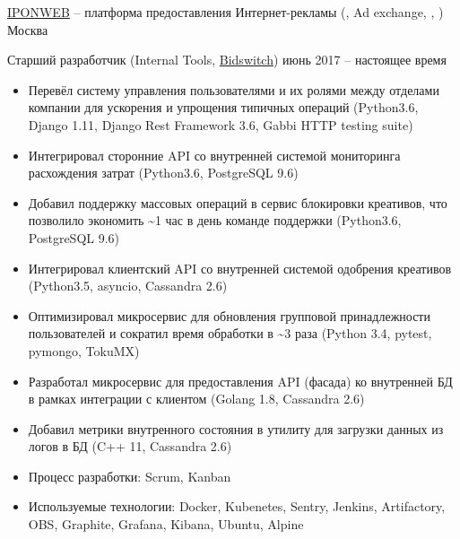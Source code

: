 \documentclass[unicode, 10pt, a4paper, oneside, fleqn]{article}
\begin{document}
\job  %
    {\href{http://www.iponweb.com}{IPONWEB} -- платформа предоставления
     Интернет-рекламы (, Ad exchange, , )}
    {Москва}
    {
        \position  %
            {Старший разработчик (Internal Tools, \href{http://www.bidswitch.com/}{Bidswitch})}
            {июнь 2017 -- настоящее время}
            {
                \begin{itemize}
                    \item{Перевёл систему управления пользователями и их ролями
                          между отделами компании для ускорения и упрощения
                          типичных операций (Python3.6, Django 1.11, Django Rest
                          Framework 3.6, Gabbi HTTP testing suite)}
                    \item{Интегрировал сторонние API со внутренней системой
                          мониторинга расхождения затрат (Python3.6, PostgreSQL 9.6)}
                    \item{Добавил поддержку массовых операций в сервис блокировки
                          креативов, что позволило экономить \textasciitilde{}1 час в день
                          команде поддержки (Python3.6, PostgreSQL 9.6)}
                    \item{Интегрировал клиентский API со внутренней системой
                          одобрения креативов (Python3.5, asyncio, Cassandra 2.6)}
                    \item{Оптимизировал микросервис для обновления групповой
                          принадлежности пользователей и сократил время обработки
                          в \textasciitilde{}3 раза (Python 3.4, pytest, pymongo, TokuMX)}
                    \item{Разработал микросервис для предоставления API (фасада) ко
                          внутренней БД в рамках интеграции с клиентом
                          (Golang 1.8, Cassandra 2.6)}
                    \item{Добавил метрики внутренного состояния в утилиту для
                          загрузки данных из логов в БД (C++ 11, Cassandra 2.6)}
                    \item{Процесс разработки: Scrum, Kanban}
                    \item{Используемые технологии: Docker, Kubenetes, Sentry, Jenkins,
                          Artifactory, OBS, Graphite, Grafana, Kibana, Ubuntu, Alpine}

\end{itemize}}}
\end{document}
